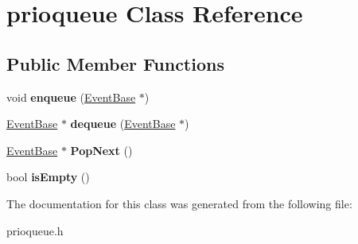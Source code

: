 \hypertarget{classprioqueue}{\section{prioqueue Class Reference}
\label{classprioqueue}
}
\subsection*{Public Member Functions}
\begin{DoxyCompactItemize}
\item 
\hypertarget{classprioqueue_a1d26a2fefd8d30b3c92d0e449c330625}{void {\bfseries enqueue} (\hyperlink{class_event_base}{Event\-Base} $\ast$)}\label{classprioqueue_a1d26a2fefd8d30b3c92d0e449c330625}

\item 
\hypertarget{classprioqueue_ab0920a604ff20b46980b2d10428aff06}{\hyperlink{class_event_base}{Event\-Base} $\ast$ {\bfseries dequeue} (\hyperlink{class_event_base}{Event\-Base} $\ast$)}\label{classprioqueue_ab0920a604ff20b46980b2d10428aff06}

\item 
\hypertarget{classprioqueue_a38aa9bcfe969f527fe70e8e37c1807b1}{\hyperlink{class_event_base}{Event\-Base} $\ast$ {\bfseries Pop\-Next} ()}\label{classprioqueue_a38aa9bcfe969f527fe70e8e37c1807b1}

\item 
\hypertarget{classprioqueue_aaa9d01e19413c4d7fa957d5ac2a7b705}{bool {\bfseries is\-Empty} ()}\label{classprioqueue_aaa9d01e19413c4d7fa957d5ac2a7b705}

\end{DoxyCompactItemize}


The documentation for this class was generated from the following file\-:\begin{DoxyCompactItemize}
\item 
prioqueue.\-h\end{DoxyCompactItemize}
